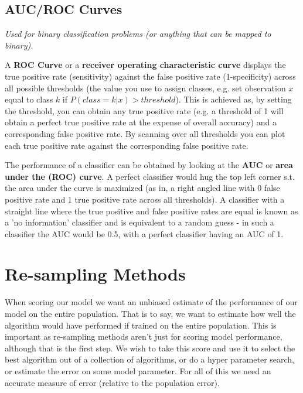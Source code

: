 \subsection{AUC/ROC Curves}

\textit{Used for binary classification problems (or anything that can be mapped to binary).}

A \textbf{ROC Curve} or a \textbf{receiver operating characteristic curve} displays the true positive rate (sensitivity) against the false positive rate (1-specificity) across all possible thresholds (the value you use to assign classes, e.g. set observation $x$ equal to class $k$ if $P(class=k|x) > threshold$). This is achieved as, by setting the threshold, you can obtain any true positive rate (e.g. a threshold of 1 will obtain a perfect true positive rate at the expense of overall accuracy) and a corresponding false positive rate. By scanning over all thresholds you can plot each true positive rate against the corresponding false positive rate. 

The performance of a classifier can be obtained by looking at the \textbf{AUC} or \textbf{area under the (ROC) curve}. A perfect classifier would hug the top left corner s.t. the area under the curve is maximized (as in, a right angled line with 0 false positive rate and 1 true positive rate across all thresholds). A classifier with a straight line where the true positive and false positive rates are equal is known as a 'no information' classifier and is equivalent to a random guess - in such a classifier the AUC would be 0.5, with a perfect classifier having an AUC of 1.

\section{Re-sampling Methods}

When scoring our model we want an unbiased estimate of the performance of our model on the entire population. That is to say, we want to estimate how well the algorithm would have performed if trained on the entire population. This is important as re-sampling methods aren't just for scoring model performance, although that is the first step. We wish to take this score and use it to select the best algorithm out of a collection of algorithms, or do a hyper parameter search, or estimate the error on some model parameter. For all of this we need an accurate measure of error (relative to the population error).

